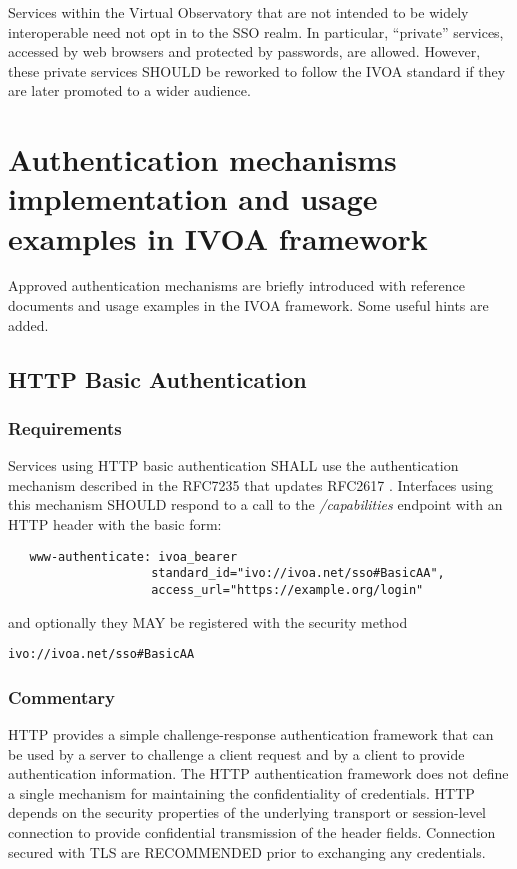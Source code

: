 \documentclass[11pt,a4paper]{ivoa}
\begin{document}
Services within the Virtual Observatory that are not intended to be
widely interoperable need not opt in to the SSO realm.
In particular, ``private'' services, accessed by web browsers and
protected by passwords, are allowed.
However, these private services SHOULD be reworked to follow the IVOA
standard if they are later promoted to a wider audience.


\section{Authentication mechanisms implementation and usage examples in
IVOA framework}

Approved authentication mechanisms are briefly introduced with reference
documents and usage examples in the IVOA framework. Some useful hints
are added.

\subsection{HTTP Basic Authentication}
\subsubsection{Requirements}
Services using HTTP basic authentication SHALL use the authentication
mechanism described in the RFC7235 \citep{std:RFC7235}
that updates RFC2617 \citep{std:RFC2617}.
Interfaces using this mechanism SHOULD respond to a call to the
\emph{/capabilities} endpoint with an HTTP header with the basic form:
\begin{verbatim}
   www-authenticate: ivoa_bearer
                    standard_id="ivo://ivoa.net/sso#BasicAA",
                    access_url="https://example.org/login"
\end{verbatim}
\noindent and optionally they MAY be registered with the security
method

 \texttt{ivo://ivoa.net/sso\#BasicAA}

\subsubsection{Commentary}
HTTP provides a simple challenge-response authentication framework that
can be used by a server to challenge
a client request and by a   client to provide authentication
information.
The HTTP authentication framework does not define a single mechanism for
maintaining the confidentiality of credentials.
HTTP depends on the security properties of the underlying transport or
session-level connection to provide
confidential transmission of the header fields. Connection secured with
TLS are RECOMMENDED prior to exchanging any credentials.
\end{document}
